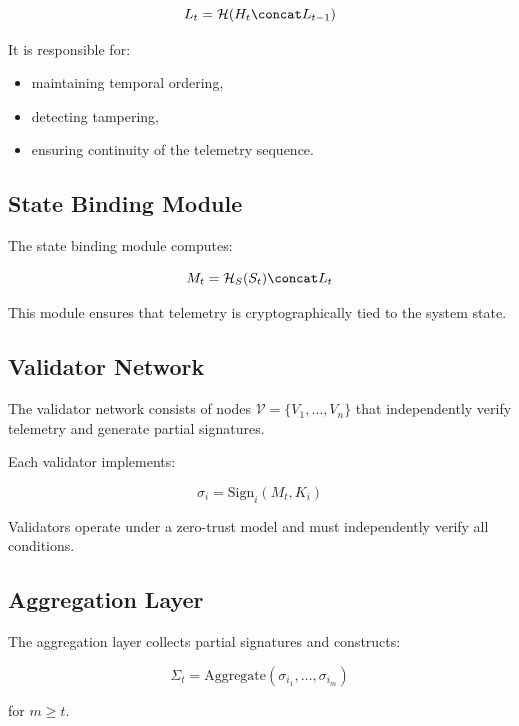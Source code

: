 \begin{equation}
L_t = \mathcal{H}(H_t \concat L_{t-1})
\end{equation}

It is responsible for:
\begin{itemize}
\item maintaining temporal ordering,
\item detecting tampering,
\item ensuring continuity of the telemetry sequence.
\end{itemize}

\subsection{State Binding Module}

The state binding module computes:

\begin{equation}
M_t = \mathcal{H}_S(S_t) \concat L_t
\end{equation}

This module ensures that telemetry is cryptographically tied to the system state.

\subsection{Validator Network}

The validator network consists of nodes $\mathcal{V} = \{V_1, \dots, V_n\}$ that independently verify telemetry and generate partial signatures.

Each validator implements:

\begin{equation}
\sigma_i = \text{Sign}_i(M_t, K_i)
\end{equation}

Validators operate under a zero-trust model and must independently verify all conditions.

\subsection{Aggregation Layer}

The aggregation layer collects partial signatures and constructs:

\begin{equation}
\Sigma_t = \text{Aggregate}(\sigma_{i_1}, \dots, \sigma_{i_m})
\end{equation}

for $m \geq t$.

